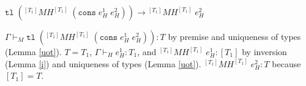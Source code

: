 \begin{case}
$\mathtt{tl}\;(^{[T_{1}]}MH^{[T_{1}]}\;(\mathtt{cons}\;e_{H}^{1}\;e_{H}^{2}))\rightarrow{^{[T_{1}]}M}H^{[T_{1}]}\;e_{H}^{2}$

$\Gamma\vdash_{M}\mathtt{tl}\;(^{[T_{1}]}MH^{[T_{1}]}\;(\mathtt{cons}\;e_{H}^{1}\;e_{H}^{2})):T$ by premise and uniqueness of types (Lemma \ref{uot}).  $T=T_{1}$, $\Gamma\vdash_{H}e_{H}^{1}:T_{1}$, and $^{[T_{1}]}MH^{[T_{1}]}\;e_{H}^{1}:[T_{1}]$ by inversion (Lemma \ref{i}) and uniqueness of types (Lemma \ref{uot}).  $^{[T_{1}]}MH^{[T_{1}]}\;e_{H}^{2}:T$ because $[T_{1}]=T$.
\end{case}